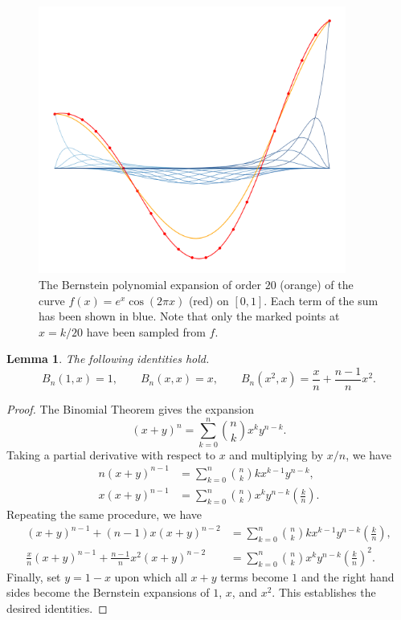 \documentclass[11pt]{article}
\newtheorem{lemma}[theorem]{Lemma}
\theoremstyle{definition}
\theoremstyle{remark}
\begin{document}
    \begin{figure}[t]
        \centering
        \includegraphics[width=0.9\textwidth]{./img/expansion_20.png}
        \caption{The Bernstein polynomial expansion of order $20$ (orange) of the
        curve $f(x) = e^x\cos(2\pi x)$ (red) on $[0, 1]$. Each term of the sum has
        been shown in blue. Note that only the marked points at $x = k / 20$ have
        been sampled from $f$.}
        \label{fig:expansion_20}
    \end{figure}

    \begin{lemma}
        The following identities hold. \[
            B_n(1, x) = 1, \qquad B_n(x, x) = x, \qquad B_n(x^2, x) = \frac{x}{n} +
            \frac{n - 1}{n}x^2.
        \] 
    \end{lemma}
    \begin{proof}
        The Binomial Theorem gives the expansion \[
            (x + y)^n = \sum_{k = 0}^n \binom{n}{k} x^k y^{n - k}.
        \] Taking a partial derivative with respect to $x$ and multiplying by $x/n$, we
        have
        \begin{align*}
            n(x + y)^{n - 1} &= \sum_{k = 0}^n \binom{n}{k} kx^{k - 1} y^{n - k}, \\
            x(x + y)^{n - 1} &= \sum_{k = 0}^n \binom{n}{k} x^k y^{n - k}
            \left( \frac{k}{n} \right).
        \end{align*}
        Repeating the same procedure, we have
        \begin{align*}
            (x + y)^{n - 1} + (n - 1)x(x + y)^{n - 2} &= \sum_{k = 0}^n \binom{n}{k}
            kx^{k - 1} y^{n - k} \left( \frac{k}{n} \right), \\
            \frac{x}{n}(x + y)^{n - 1} + \frac{n - 1}{n}x^2(x + y)^{n - 2} &= \sum_{k
            = 0}^n \binom{n}{k} x^k y^{n - k} \left( \frac{k}{n} \right)^2.
        \end{align*}
        Finally, set $y = 1 - x$ upon which all $x + y$ terms become $1$ and the
        right hand sides become the Bernstein expansions of $1$, $x$, and $x^2$. This
        establishes the desired identities.
    \end{proof}
    
\end{document}
